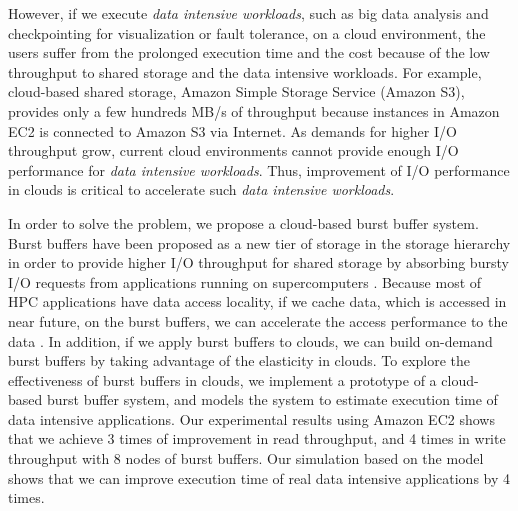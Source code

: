 However, if we execute \emph{data intensive workloads}, such as big data
analysis and checkpointing for visualization or fault tolerance, on a cloud environment, the
users suffer from the prolonged execution time and the cost because of the low
throughput to shared storage and the data intensive workloads.
For example, cloud-based shared storage, Amazon Simple Storage Service (Amazon
S3), provides only a few hundreds MB/s of throughput because instances
in Amazon EC2 is connected to Amazon S3 via Internet.
As demands for higher I/O throughput grow, 
current cloud environments cannot provide enough I/O performance for 
\emph{data intensive workloads}.
Thus, improvement of I/O performance in clouds is critical to accelerate such
\emph{data intensive workloads}.
\par
In order to solve the problem, we propose a cloud-based burst buffer system.
Burst buffers have been proposed as a new tier of storage in the storage
hierarchy in order to provide higher I/O throughput for shared storage by
absorbing bursty I/O requests from applications running on supercomputers
\cite{on_the_role_of_burst_buffers}.
Because most of HPC applications have data access
locality, if we cache data, which is accessed in near future, on the burst
buffers, we can accelerate the access performance to the data
.
In addition, if we apply burst buffers to clouds, we can build on-demand burst
buffers by taking advantage of the elasticity in clouds. 
To explore the effectiveness of burst buffers in clouds, 
we implement a prototype of a cloud-based burst buffer system, and models the
system to estimate execution time of data intensive applications.
Our experimental results using Amazon EC2 shows that we achieve 3 times of
improvement in read throughput, and 4 times in write throughput with 8 nodes of
burst buffers. Our simulation based on the model shows that we can
improve execution time of real data intensive applications by 4 times.
\par


